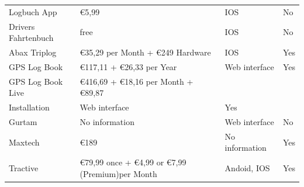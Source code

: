 \begin{tabular}{p{4cm}p{5cm}p{3cm}p{2cm}}
Logbuch App                & \euro 5,99                                                                                                  & IOS                   & No  \\ 
Drivers Fahrtenbuch        & free                                                                                                        & IOS                   & No  \\ 
Abax Triplog               & \euro 35,29 per Month + \euro 249 Hardware                                                                  & IOS                   & Yes \\ 
GPS Log Book               & \euro 117,11 + \euro 26,33 per Year                                                                         & Web interface         & Yes \\ 
GPS Log Book Live          & \euro 416,69 + \euro 18,16 per Month + \euro 89,87\\   Installation & Web interface         & Yes \\
Gurtam                     & No information                                                                                              & Web interface         & No  \\ 
Maxtech                    & \euro 189                                                                                                   & No information        & Yes \\ 
Tractive                   & \euro 79,99 once + \euro 4,99 or \euro 7,99 (Premium)per Month                                              & Andoid, IOS           & Yes \\ 
\bottomrule
\end{tabular}

